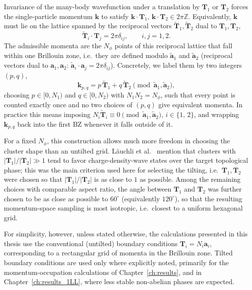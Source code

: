Invariance of the many-body wavefunction under a translation by $\mathbf{T}_1$ or $\mathbf{T}_2$ forces the single-particle momentum $\mathbf{k}$ to satisfy $\mathbf{k}\cdot\mathbf{T}_1, \, \mathbf{k}\cdot\mathbf{T}_2 \in 2\pi\mathbb{Z}$. Equivalently, $\mathbf{k}$ must lie on the lattice spanned by the reciprocal vectors $\tilde{\mathbf{T}}_1, \tilde{\mathbf{T}}_2$ dual to $\mathbf{T}_1, \mathbf{T}_2$,
\begin{equation}
    \tilde{\mathbf{T}}_i \cdot \mathbf{T}_j = 2\pi \delta_{ij}, \qquad i,j = 1,2.
    \label{eq:dual_vectors}
\end{equation}
The admissible momenta are the $N_\phi$ points of this reciprocal lattice that fall within one Brillouin zone, i.e.\ they are defined modulo $\tilde{\mathbf{a}}_1$ and $\tilde{\mathbf{a}}_2$ (reciprocal vectors dual to $\mathbf{a}_1, \mathbf{a}_2$: $\tilde{\mathbf{a}}_i \cdot \mathbf{a}_j = 2\pi \delta_{ij}$). Concretely, we label them by two integers $(p,q)$,
\begin{equation}
    \mathbf{k}_{p,q} = p\,\tilde{\mathbf{T}}_1 + q\,\tilde{\mathbf{T}}_2 \pmod{\tilde{\mathbf{a}}_1, \tilde{\mathbf{a}}_2},
    \label{eq:tilted_momenta}
\end{equation}
choosing $p \in [0, N_1)$ and $q \in [0, N_2)$ with $N_1 N_2 = N_\phi$, such that every point is counted exactly once and no two choices of $(p,q)$ give equivalent momenta. In practice this means imposing $N_i\tilde{\mathbf{T}}_i \equiv 0 \pmod{\tilde{\mathbf{a}}_1,\tilde{\mathbf{a}}_2},\, i\in \{ 1,\,2\}$, and wrapping $\mathbf{k}_{p,q}$ back into the first BZ whenever it falls outside of it.


For a fixed $N_\phi$, this construction allows much more freedom in choosing the cluster shape than an untilted grid. L\"auchli et al.~\cite{lauchli2013hierarchy} mention that clusters with $|\mathbf{T}_1|/|\mathbf{T}_2| \gg 1$ tend to favor charge-density-wave states over the target topological phase; this was the main criterion used here for selecting the tilting, i.e.\ $\mathbf{T}_1, \mathbf{T}_2$ were chosen so that $|\mathbf{T}_1|/|\mathbf{T}_2|$ is as close to $1$ as possible. Among the remaining choices with comparable aspect ratio, the angle between $\mathbf{T}_1$ and $\mathbf{T}_2$ was further chosen to be as close as possible to $60^\circ$ (equivalently $120^\circ$), so that the resulting momentum-space sampling is most isotropic, i.e.\ closest to a uniform hexagonal grid.

For simplicity, however, unless stated otherwise, the calculations presented in this thesis use the conventional (untilted) boundary conditions $\mathbf{T}_i = N_i\mathbf{a}_i$, corresponding to a rectangular grid of momenta in the Brillouin zone. Tilted boundary conditions are used only where explicitly noted, primarily for the momentum-occupation calculations of Chapter~\ref{ch:results}, and in Chapter~\ref{ch:results_1LL}, where less stable non-abelian phases are expected.
